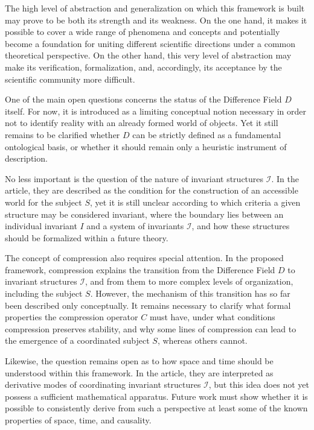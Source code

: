 \documentclass[aps,prd,onecolumn,nofootinbib,superscriptaddress]{revtex4-2} %
\begin{document}
    The high level of abstraction and generalization on which this framework is built may prove to be both its strength and its weakness. On the one hand, it makes it possible to cover a wide range of phenomena and concepts and potentially become a foundation for uniting different scientific directions under a common theoretical perspective. On the other hand, this very level of abstraction may make its verification, formalization, and, accordingly, its acceptance by the scientific community more difficult.

    One of the main open questions concerns the status of the Difference Field \(D\) itself. For now, it is introduced as a limiting conceptual notion necessary in order not to identify reality with an already formed world of objects. Yet it still remains to be clarified whether \(D\) can be strictly defined as a fundamental ontological basis, or whether it should remain only a heuristic instrument of description.

    No less important is the question of the nature of invariant structures \(\mathcal{I}\). In the article, they are described as the condition for the construction of an accessible world for the subject \(S\), yet it is still unclear according to which criteria a given structure may be considered invariant, where the boundary lies between an individual invariant \(I\) and a system of invariants \(\mathcal{I}\), and how these structures should be formalized within a future theory.

    The concept of compression also requires special attention. In the proposed framework, compression explains the transition from the Difference Field \(D\) to invariant structures \(\mathcal{I}\), and from them to more complex levels of organization, including the subject \(S\). However, the mechanism of this transition has so far been described only conceptually. It remains necessary to clarify what formal properties the compression operator \(C\) must have, under what conditions compression preserves stability, and why some lines of compression can lead to the emergence of a coordinated subject \(S\), whereas others cannot.

    Likewise, the question remains open as to how space and time should be understood within this framework. In the article, they are interpreted as derivative modes of coordinating invariant structures \(\mathcal{I}\), but this idea does not yet possess a sufficient mathematical apparatus. Future work must show whether it is possible to consistently derive from such a perspective at least some of the known properties of space, time, and causality.
\end{document}
